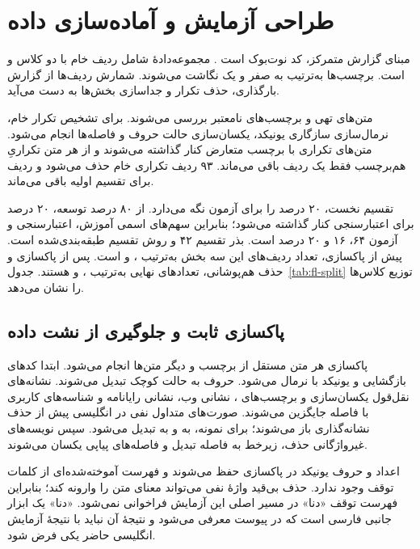 \section{طراحی آزمایش و آماده‌سازی داده}
\label{sec:corrected-protocol}
مبنای گزارش متمرکز، کد نوت‌بوک  است \cite{notebook-models}. مجموعه‌دادۀ  شامل  ردیف خام با دو کلاس  و  است. برچسب‌ها به‌ترتیب به صفر و یک نگاشت می‌شوند. شمارش ردیف‌ها از گزارش بارگذاری، حذف تکرار و جداسازی بخش‌ها به دست می‌آید.

متن‌های تهی و برچسب‌های نامعتبر بررسی می‌شوند. برای تشخیص تکرار خام، نرمال‌سازی سازگاری یونیکد، یکسان‌سازی حالت حروف و فاصله‌ها انجام می‌شود. متن‌های تکراری با برچسب متعارض کنار گذاشته می‌شوند و از هر متن تکراریِ هم‌برچسب فقط یک ردیف باقی می‌ماند. ۹۳ ردیف تکراری خام حذف می‌شود و  ردیف برای تقسیم اولیه باقی می‌ماند.

تقسیم نخست، ۲۰ درصد را برای آزمون نگه می‌دارد. از ۸۰ درصد توسعه، ۲۰ درصد برای اعتبارسنجی کنار گذاشته می‌شود؛ بنابراین سهم‌های اسمی آموزش، اعتبارسنجی و آزمون ۶۴، ۱۶ و ۲۰ درصد است. بذر تقسیم ۴۲ و روش تقسیم طبقه‌بندی‌شده است. پیش از پاکسازی، تعداد ردیف‌های این سه بخش به‌ترتیب ،  و  است. پس از پاکسازی و حذف هم‌پوشانی، تعدادهای نهایی به‌ترتیب ،  و  هستند. جدول~\ref{tab:fl-split} توزیع کلاس‌ها را نشان می‌دهد.

\subsection{پاکسازی ثابت و جلوگیری از نشت داده}
پاکسازی هر متن مستقل از برچسب و دیگر متن‌ها انجام می‌شود. ابتدا کدهای  بازگشایی و یونیکد با  نرمال می‌شود. حروف به حالت کوچک تبدیل می‌شوند. نشانه‌های نقل‌قول یکسان‌سازی و برچسب‌های ، نشانی وب، نشانی رایانامه و شناسه‌های کاربری با فاصله جایگزین می‌شوند. صورت‌های متداول نفی در انگلیسی پیش از حذف نشانه‌گذاری باز می‌شوند؛ برای نمونه،  به  و  به  تبدیل می‌شود. سپس نویسه‌های غیرواژگانی حذف، زیرخط به فاصله تبدیل و فاصله‌های پیاپی یکسان می‌شوند.

اعداد و حروف یونیکد در پاکسازی حفظ می‌شوند و فهرست آموخته‌شده‌ای از کلمات توقف وجود ندارد. حذف بی‌قید واژۀ نفی می‌تواند معنای متن را وارونه کند؛ بنابراین فهرست توقف «دنا» در مسیر اصلی این آزمایش فراخوانی نمی‌شود. «دنا» یک ابزار جانبی فارسی است که در پیوست معرفی می‌شود و نتیجۀ آن نباید با نتیجۀ آزمایش انگلیسی حاضر یکی فرض شود.

